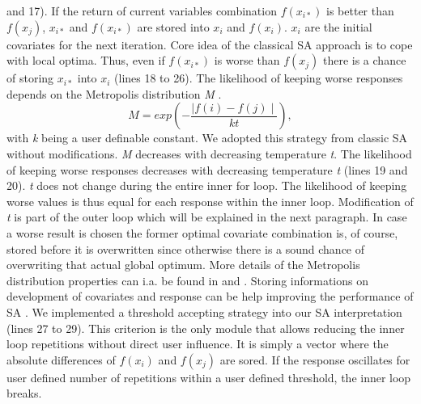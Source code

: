and 17). If the return of current variables combination $f(x_{i*})$ is better than $f(x_j)$, $x_{i*}$ and $f(x_{i*})$ are stored into $x_{i}$ and $f(x_{i})$. $x_{i}$ are the initial covariates for the next iteration. Core idea of the classical SA approach is to cope with local optima. Thus, even if $f(x_{i*})$ is worse than $f(x_{j})$ there is a chance of storing $x_{i*}$ into $x_{i}$ (lines 18 to 26). The likelihood of keeping worse responses depends on the Metropolis distribution \textit{M} \citep{metropolis_1953}.
\begin{equation}
\label{eq:eq1}
M = exp \left(-\frac{\mid f(i)-f(j)\mid}{kt}\right),
\end{equation}
with \textit{k} being a user definable constant. We adopted this strategy from classic SA without modifications. \textit{M} decreases with decreasing temperature \textit{t}. The likelihood of keeping worse responses decreases with decreasing temperature \textit{t} (lines 19 and 20). \textit{t} does not change during the entire inner for loop. The likelihood of keeping worse values is thus equal for each response within the inner loop. Modification of \textit{t} is part of the outer loop which will be explained in the next paragraph. In case a worse result is chosen the former optimal covariate combination is, of course, stored before it is overwritten since otherwise there is a sound chance of overwriting that actual global optimum. More details of the Metropolis distribution properties can i.a. be found in \citet{kirkpatrick_1983} and \citet{metropolis_1953}. Storing informations on development of covariates and response can be help improving the performance of SA \citep{lin_1995, hansen_2012}. We implemented a threshold accepting strategy \citep{dueck_1990} into our SA interpretation (lines 27 to 29). This criterion is the only module that allows reducing the inner loop repetitions without direct user influence. It is simply a vector where the absolute differences of $f(x_{i})$ and $f(x_j)$ are sored. If the response oscillates for user defined number of repetitions within a user defined threshold, the inner loop breaks.

